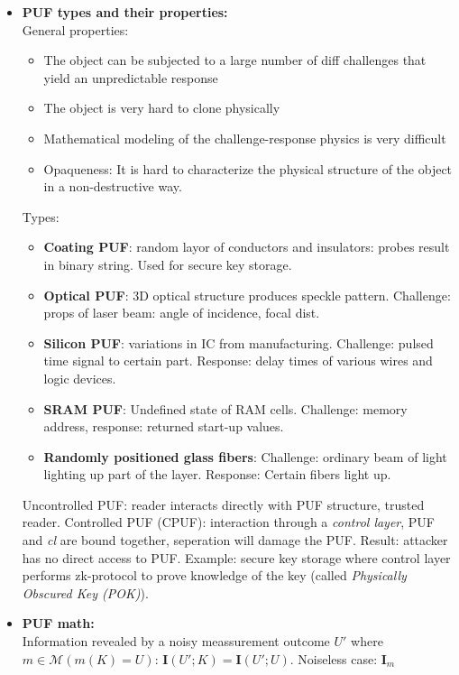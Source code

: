 \documentclass[twocolumn,9pt]{extarticle}
\begin{document}
\begin{itemize}
	\item \textbf{PUF types and their properties: } \\
	General properties:
	\begin{itemize}
		\item The object can be subjected to a large number of diff challenges that yield an unpredictable response
		\item The object is very hard to clone physically
		\item Mathematical modeling of the challenge-response physics is very difficult
		\item Opaqueness: It is hard to characterize the physical structure of the object in a non-destructive way.
	\end{itemize}
	Types:
	\begin{itemize}
		\item \textbf{Coating PUF}: random layor of conductors and insulators: probes result in binary string. Used for secure key storage.
		\item \textbf{Optical PUF}: 3D optical structure produces speckle pattern. Challenge: props of laser beam: angle of incidence, focal dist.
		\item \textbf{Silicon PUF}: variations in IC from manufacturing. Challenge: pulsed time signal to certain part. Response: delay times of various wires and logic devices.
		\item \textbf{SRAM PUF}: Undefined state of RAM cells. Challenge: memory address, response: returned start-up values.
		\item \textbf{Randomly positioned glass fibers}: Challenge: ordinary beam of light lighting up part of the layer. Response: Certain fibers light up.
	\end{itemize}
	Uncontrolled PUF: reader interacts directly with PUF structure, trusted reader. Controlled PUF (CPUF): interaction through a \emph{control layer}, PUF and \emph{cl} are bound together, seperation will damage the PUF. Result: attacker has no direct access to PUF. Example: secure key storage where control layer performs zk-protocol to prove knowledge of the key (called \emph{Physically Obscured Key (POK)}).

	\item \textbf{PUF math:} \\
	Information revealed by a noisy meassurement outcome $U'$ where $m \in \mathcal{M} (m(K) = U)$: $\mathbf{I}(U';K) = \mathbf{I}(U';U)$. Noiseless case: $\mathbf{I}_m$\\


\end{itemize}
\end{document}
